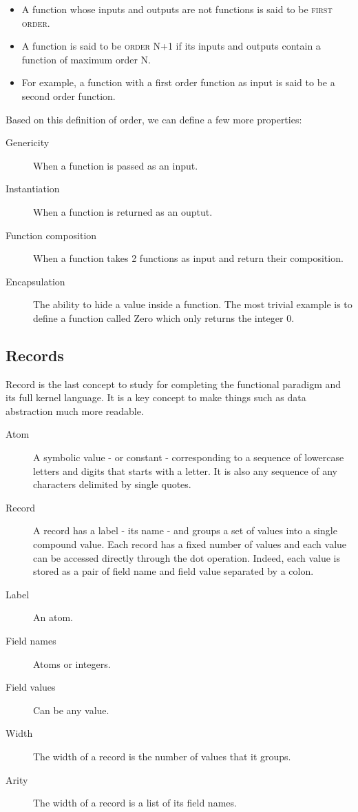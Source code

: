 \documentclass[11pt,a4paper,twoside,openright]{report}
\begin{document}
\begin{itemize}
	\item A function whose inputs and outputs are not functions is said to 
be \textsc{first order}.
	\item A function is said to be \textsc{order N+1} if its inputs and 
outputs contain a function of maximum order N.
	\item For example, a function with a first order function as input is 
said to be a second order function.
\end{itemize}
Based on this definition of order, we can define a few more properties:

\begin{description}
	\item[Genericity] When a function is passed as an input.
	\item[Instantiation] When a function is returned as an ouptut.
	\item[Function composition] When a function takes 2 functions as input 
and return their composition.
	\item[Encapsulation] The ability to hide a value inside a function. The 
most trivial example is to define a function called Zero which only returns the 
integer 0.
\end{description}

\subsection{Records}

Record is the last concept to study for completing the functional paradigm and 
its full kernel language. It is a key concept to make things such as data 
abstraction much more readable.

\begin{description}
	\item[Atom] A symbolic value - or constant - corresponding to a 
sequence of lowercase letters and digits that starts with a letter. It is also 
any sequence of any characters delimited by single quotes.
	\item[Record] A record has a label - its name - and groups a set of 
values into a single compound value. Each record has a fixed number of values 
and each value can be accessed directly through the dot operation. Indeed, each 
value is stored as a pair of field name and field value separated by a colon.
	\item[Label] An atom.
	\item[Field names] Atoms or integers.
	\item[Field values] Can be any value.
	\item[Width] The width of a record is the number of values that it  
groups.
	\item[Arity] The width of a record is a list of its field names.
\end{description}
\end{document}
